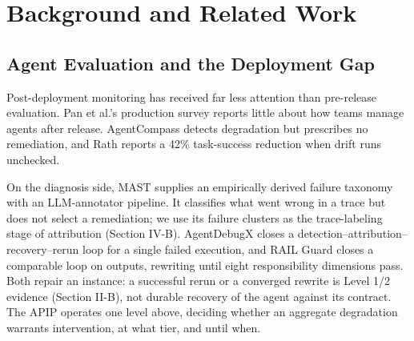 \documentclass[conference]{IEEEtran}
\begin{document}
\section{Background and Related Work}

\subsection{Agent Evaluation and the Deployment Gap}

Post-deployment monitoring has received far less attention than pre-release evaluation. Pan et al.'s production survey \cite{ref5} reports little about how teams manage agents after release. AgentCompass \cite{ref9} detects degradation but prescribes no remediation, and Rath \cite{ref10} reports a 42\% task-success reduction when drift runs unchecked.

On the diagnosis side, MAST \cite{ref8} supplies an empirically derived failure taxonomy with an LLM-annotator pipeline. It classifies what went wrong in a trace but does not select a remediation; we use its failure clusters as the trace-labeling stage of attribution (Section IV-B). AgentDebugX \cite{ref11} closes a detection--attribution--recovery--rerun loop for a single failed execution, and RAIL Guard \cite{ref12} closes a comparable loop on outputs, rewriting until eight responsibility dimensions pass. Both repair an instance: a successful rerun or a converged rewrite is Level 1/2 evidence (Section II-B), not durable recovery of the agent against its contract. The APIP operates one level above, deciding whether an aggregate degradation warrants intervention, at what tier, and until when.
\end{document}
